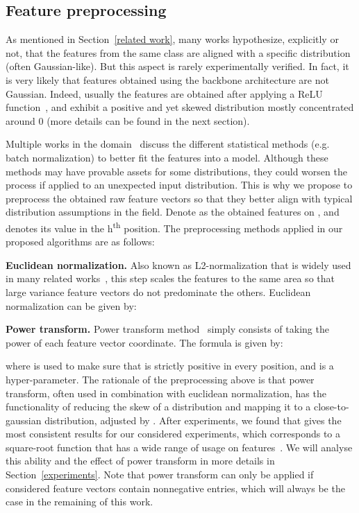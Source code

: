 \documentclass[review]{elsarticle}
\begin{document}
\subsection{Feature preprocessing}

As mentioned in Section~\ref{related work}, many works hypothesize, explicitly or not, that the features from the same class are aligned with a specific distribution (often Gaussian-like). But this aspect is rarely experimentally verified. In fact, it is very likely that features obtained using the backbone architecture are not Gaussian. Indeed, usually the features are obtained after applying a ReLU function~\cite{DBLP:journals/corr/abs-1803-08375}, and exhibit a positive and yet skewed distribution mostly concentrated around 0 (more details can be found in the next section). 



Multiple works in the domain~\cite{DBLP:journals/corr/abs-1911-04623, lichtenstein2020tafssl} discuss the different statistical methods (e.g. batch normalization) to better fit the features into a model. Although these methods may have provable assets for some distributions, they could worsen the process if applied to an unexpected input distribution. This is why we propose to preprocess the obtained raw feature vectors so that they better align with typical distribution assumptions in the field. Denote  as the obtained features on , and  denotes its value in the h\textsuperscript{th} position. The preprocessing methods applied in our proposed algorithms are as follows:  

\textbf{Euclidean normalization.} Also known as L2-normalization that is widely used in many related works~\cite{DBLP:journals/corr/abs-1911-04623, DBLP:conf/iclr/YangLX21, hu2021graph}, this step scales the features to the same area so that large variance feature vectors do not predominate the others. Euclidean normalization can be given by:


\textbf{Power transform.} Power transform method~\cite{tukey1977exploratory,hu2021leveraging} simply consists of taking the power of each feature vector coordinate. The formula is given by:

where  is used to make sure that  is strictly positive in every position, and  is a hyper-parameter. The rationale of the preprocessing above is that power transform, often used in combination with euclidean normalization, has the functionality of reducing the skew of a distribution and mapping it to a close-to-gaussian distribution, adjusted by . After experiments, we found that  gives the most consistent results for our considered experiments, which corresponds to a square-root function that has a wide range of usage on features~\cite{cinbis2015approximate}. We will analyse this ability and the effect of power transform in more details in Section~\ref{experiments}. Note that power transform can only be applied if considered feature vectors contain nonnegative entries, which will always be the case in the remaining of this work.
\end{document}
